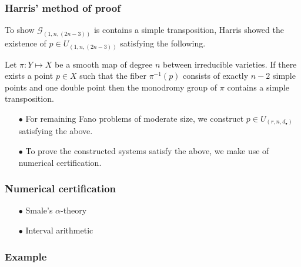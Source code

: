 \documentclass{beamer}
\begin{document}
\begin{frame}
\frametitle{Harris' method of proof}

To show $\mathcal{G}_{(1,n,(2n-3))}$ is contains a simple transposition, Harris showed the existence of $p\in U_{(1,n,(2n-3))}$ satisfying the following.

\begin{lemma}[Harris]

\vspace{.05cm}

Let $\pi:Y\mapsto X$ be a smooth map of degree $n$ between irreducible varieties. If there exists a point $p\in X$ such that the fiber $\pi^{-1}(p)$ consists of exactly $n-2$ simple points and one double point then the monodromy group of $\pi$ contains a simple transposition.
\end{lemma}

\begin{enumerate}
\pause

\item[$\bullet$] For remaining Fano problems of moderate size, we construct $p\in U_{(r,n,d_\bullet)}$ satisfying the above.

\pause

\item[$\bullet$] To prove the constructed systems satisfy the above, we make use of numerical certification.

\end{enumerate}
\end{frame}


\begin{frame}
\frametitle{Numerical certification}
\begin{enumerate}
\item[$\bullet$] Smale's $\alpha$-theory

\item[$\bullet$] Interval arithmetic

\end{enumerate}
\end{frame}

\begin{frame}
\frametitle{Example}

\end{frame}
\end{document}
